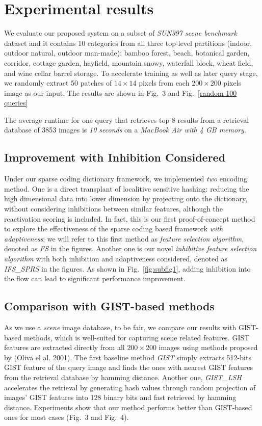 \documentclass[letterpaper]{article}
\begin{document}
\section{Experimental results}
We evaluate our proposed system on a subset of \emph{SUN397 scene benchmark} dataset and it contains 10 categories from all three top-level partitions (indoor, outdoor natural, outdoor man-made): bamboo forest, beach, botanical garden, corridor, cottage garden, hayfield, mountain snowy, waterfall block, wheat field, and wine cellar barrel storage. To accelerate training as well as later query stage, we randomly extract 50 patches of $14\times14$ pixels from each $200\times200$ pixels image as our input. The results are shown in Fig.~3 and Fig.~\ref{random 100 queries}

The average runtime for one query that retrieves top 8 results from a retrieval database of 3853 images is \emph{10 seconds} on a \emph{MacBook Air with 4 GB memory.}

\subsection{Improvement with Inhibition Considered}
Under our sparse coding dictionary framework, we implemented \emph{two} encoding method. One is a direct transplant of localitive sensitive hashing: reducing the high dimensional data into lower dimension by projecting onto the dictionary, without considering inhibitions between similar features, although the reactivation scoring is included. In fact, this is our first proof-of-concept method to explore the effectiveness of the sparse coding based framework \emph{with adaptiveness}; we will refer to this first method as \emph{feature selection algorithm}, denoted as \emph{FS} in the figures. Another one is our novel \emph{inhibitive feature selection algorithm} with both inhibition and adaptiveness considered, denoted as \emph{IFS\_SPRS} in the figures. As shown in Fig.~\ref{fig:subfig1}, adding inhibition into the flow can lead to significant performance improvement.

\subsection{Comparison with GIST-based methods}
As we use a \emph{scene} image database, to be fair, we compare our results with GIST-based methods, which is well-suited for capturing scene related features. GIST features are extracted directly from all $200\times 200$ images using methods proposed by (Oliva el al. 2001).
The first baseline method \emph{GIST} simply extracts 512-bits GIST feature of the query image and finds the ones with nearest GIST features from the retrieval database by hamming distance. Another one, \emph{GIST\_LSH} accelerates the retrieval by generating hash values through random projection of images' GIST features into 128 binary bits and fast retrieved by hamming distance. Experiments show that our method performs better than GIST-based ones for most cases (Fig.~3 and Fig.~4).
\end{document}
